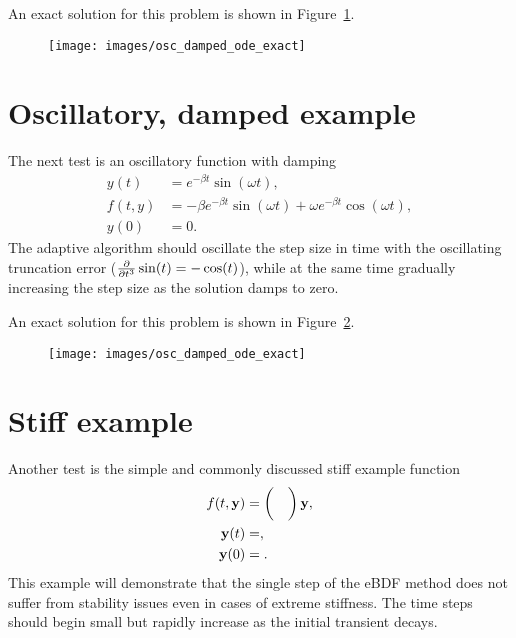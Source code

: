 An exact solution for this problem is shown in Figure~\ref{fig:imr-poly2-exact}.

\begin{figure}[h!]
  \centering
  \texttt{[image: images/osc\_damped\_ode\_exact]}
  \caption{}
  \label{fig:imr-poly2-exact}
\end{figure}



\section{Oscillatory, damped example}
\label{sec:oscill-damp-example}

The next test is an oscillatory function with damping
\begin{equation}
  \label{eqn:imr-test-osc-damp}
  \begin{aligned}
    y(t) &= e^{-\beta t} \sin(\omega t), \\
    f(t,y) &= - \beta e^{-\beta t} \sin(\omega t) + \omega e^{-\beta t} \cos(\omega t), \\
    y(0) &= 0.
  \end{aligned}
\end{equation} 
The adaptive algorithm should oscillate the step size in time with the oscillating truncation error ($\frac{\partial }{\partial t^3} \sin(t) = -\cos(t)$), while at the same time gradually increasing the step size as the solution damps to zero.

An exact solution for this problem is shown in Figure~\ref{fig:imr-osc-exact}.

\begin{figure}[h!]
  \centering
  \texttt{[image: images/osc\_damped\_ode\_exact]}
  \caption{}
  \label{fig:imr-osc-exact}
\end{figure}



\section{Stiff example}
\label{sec:imr-stiff-example}

Another test is the simple and commonly discussed stiff example function \cite{??ds Iserles?}
\begin{equation}
  \label{eqn:imr-test-stiff}
  \begin{aligned}
    f(t, \mathbf{y}) &= 
    \begin{pmatrix}
      &  \\
      &  \\
    \end{pmatrix} \mathbf{y}, \\
    \mathbf{y}(t) &= , \\
    \mathbf{y}(0) &= .
  \end{aligned}
\end{equation} 
This example will demonstrate that the single step of the eBDF method does not suffer from stability issues even in cases of extreme stiffness.
The time steps should begin small but rapidly increase as the initial transient decays.


